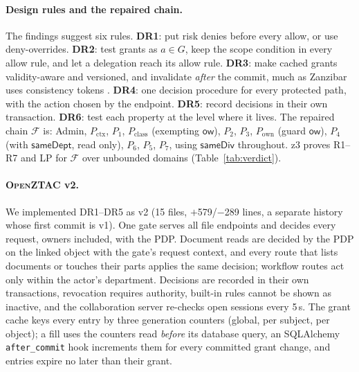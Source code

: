 \documentclass[sigconf,review,anonymous]{acmart}
\newcommand{\sysname}{\textsc{OpenZTAC}\xspace}
\newcommand{\sysname}{\textsc{Atrium}\xspace}
\newcommand{\sysname}{\textsc{OpenZTAC}\xspace}
\newcommand{\Pc}{P_{\mathrm{class}}}
\newcommand{\Px}{P_{\mathrm{ctx}}}
\newcommand{\Po}{P_{\mathrm{own}}}
\newcommand{\ow}{\mathsf{ow}}
\newcommand{\sameDept}{\mathsf{sameDept}}
\newcommand{\sameDiv}{\mathsf{sameDiv}}
\begin{document}
\paragraph{Design rules and the repaired chain.} The findings suggest six rules. \textbf{DR1}: put risk denies before
every allow, or use deny-overrides. \textbf{DR2}: test grants as $a\in G$, keep the scope condition in every allow
rule, and let a delegation reach its allow rule. \textbf{DR3}: make cached grants validity-aware and versioned, and
invalidate \emph{after} the commit, much as Zanzibar uses consistency tokens \cite{pang2019zanzibar}. \textbf{DR4}: one
decision procedure for every protected path, with the action chosen by the endpoint. \textbf{DR5}: record decisions in
their own transaction. \textbf{DR6}: test each property at the level where it lives. The repaired chain $\mathcal{F}$
is: Admin, $\Px$, $P_1$, $\Pc$ (exempting $\ow$), $P_2$, $P_3$, $\Po$ (guard $\ow$), $P_4$ (with $\sameDept$, read
only), $P_6$, $P_5$, $P_7$, using $\sameDiv$ throughout. z3 proves R1--R7 and LP for $\mathcal{F}$ over unbounded
domains (Table~\ref{tab:verdict}).

\paragraph{\sysname v2.} We implemented DR1--DR5 as v2 (15 files, $+$579/$-$289 lines, a separate history whose first
commit is v1). One gate serves all file endpoints and decides every request, owners included, with the PDP. Document
reads are decided by the PDP on the linked object with the gate's request context, and every route that lists
documents or touches their parts applies the same decision; workflow routes act only within the actor's department.
Decisions are recorded in their own transactions, revocation requires authority, built-in rules cannot be shown as
inactive, and the collaboration server re-checks open sessions every 5\,s. The grant cache keys every entry by three
generation counters (global, per subject, per object); a fill uses the counters read \emph{before} its database
query, an SQLAlchemy \texttt{after\_commit} hook increments them for every committed grant change, and entries expire
no later than their grant.
\end{document}
